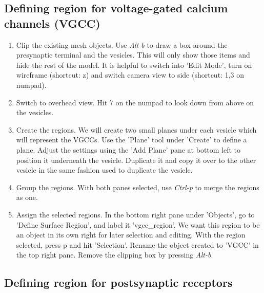 \documentclass[twoside,a4paper]{refart}
\begin{document}
\subsection{Defining region for voltage-gated calcium channels (VGCC)}

\begin{enumerate}
\item   Clip the existing mesh objects. Use \textit{Alt-b} to draw a box around the presynaptic terminal and the vesicles. This will only show those items and hide the rest of the model. It is helpful to switch into 'Edit Mode', turn on wireframe (shortcut: z) and switch camera view to side (shortcut: 1,3 on numpad).
    
\item   Switch to overhead view. Hit 7 on the numpad to look down from above on the vesicles. 

\item   Create the regions. We will create two small planes under each vesicle which will represent the VGCCs. Use the 'Plane' tool under 'Create' to define a plane. Adjust the settings using the 'Add Plane' pane at bottom left to position it underneath the vesicle. Duplicate it and copy it over to the other vesicle in the same fashion used to duplicate the vesicle. 

\item Group the regions. With both panes selected, use \textit{Ctrl-p} to merge the regions as one.

\item   Assign the selected regions. In the bottom right pane under 'Objects', go to 'Define Surface Region', and label it 'vgcc\_region'. We want this region to be an object in its own right for later selection and editing. With the region selected, press p and hit 'Selection'. Rename the object created to 'VGCC' in the top right pane. Remove the clipping box by pressing \textit{Alt-b}.
\end{enumerate}

\subsection{Defining region for postsynaptic receptors}
\end{document}

